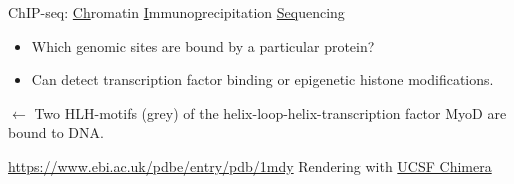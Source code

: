 \documentclass[10pt]{beamer}
\newcommand{\credit}[1]{{\vspace{\fill} \par \raggedleft \scriptsize \mdseries \color{mDarkBrown} #1 \par}}
\begin{document}
\begin{frame}{ChIP-seq: \underline{Ch}romatin \underline{I}mmuno\underline{p}recipitation \underline{Seq}uencing}
	\begin{minipage}{.46\linewidth}
		\begin{center}
			{}
		\end{center}
	\end{minipage}
	\begin{minipage}{.53\linewidth}
		\begin{itemize}
			\item Which genomic sites are bound by a particular protein?
			\item Can detect transcription factor binding or epigenetic histone modifications.
		\end{itemize}
		\vspace{2em}
		{\begin{flushleft}
				\scriptsize $\leftarrow$ Two HLH-motifs (grey) of the  helix-loop-helix-transcription factor MyoD are bound to DNA.\end{flushleft}}
	\end{minipage}%
	\credit{\begin{flushleft}
			\url{https://www.ebi.ac.uk/pdbe/entry/pdb/1mdy} \linebreak Rendering with \href{http://www.cgl.ucsf.edu/chimera}{UCSF Chimera} \end{flushleft}}
\end{frame}
\end{document}

